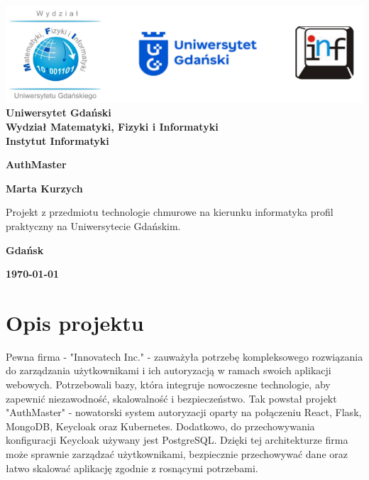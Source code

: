 \documentclass[12pt,a4paper]{article}
\newcommand{\hmwkTitle}{AuthMaster} %
\newcommand{\hmwkDueDate}{\today} %
\newcommand{\hmwkAuthorName}{Marta Kurzych} %
\begin{document}
\begin{titlepage}
    \vfill
	\begin{center}
	\hspace*{-1cm}
	\vspace*{0.5cm}
    \includegraphics[scale=0.55]{imagens/loga.png}\\
	\textbf{Uniwersytet Gdański \\ [0.05cm]Wydział Matematyki, Fizyki i Informatyki \\ [0.05cm] Instytut Informatyki}

	\vspace{0.6cm}
	\vspace{4cm}
	{\huge \textbf{\hmwkTitle}}\vspace{8mm}
	
	{\large \textbf{\hmwkAuthorName}}\\[3cm]
	
		\hspace{.45\textwidth} %
	   \begin{minipage}{.5\textwidth}
	   Projekt z przedmiotu technologie chmurowe na kierunku informatyka profil praktyczny na Uniwersytecie Gdańskim.\\[0.1cm]
	  \end{minipage}
	  \vfill
	
	\textbf{Gdańsk}
	
	\textbf{\hmwkDueDate}
	\end{center}
	
\end{titlepage}

\newpage
\setcounter{secnumdepth}{5}
\tableofcontents
\newpage

\section{Opis projektu}
\label{sec:Project}

Pewna firma - "Innovatech Inc." - zauważyła potrzebę kompleksowego rozwiązania do zarządzania użytkownikami i ich autoryzacją w ramach swoich aplikacji webowych. Potrzebowali bazy, która integruje nowoczesne technologie, aby zapewnić niezawodność, skalowalność i bezpieczeństwo. Tak powstał projekt "AuthMaster" - nowatorski system autoryzacji oparty na połączeniu React, Flask, MongoDB, Keycloak oraz Kubernetes. Dodatkowo, do przechowywania konfiguracji Keycloak używany jest PostgreSQL. Dzięki tej architekturze firma może sprawnie zarządzać użytkownikami, bezpiecznie przechowywać dane oraz łatwo skalować aplikację zgodnie z rosnącymi potrzebami.
\end{document}
